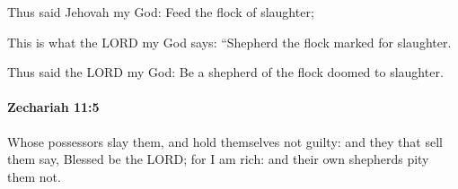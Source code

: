 			\begin{versebox}
					\item[BHS] 
					\item[LXX] 
					\item[ASV] Thus said Jehovah my God: Feed the flock of slaughter;
					\item[NIV] This is what the LORD my God says: “Shepherd the flock marked for slaughter.
					\item[NRSV] Thus said the LORD my God: Be a shepherd of the flock doomed to slaughter.
			\end{versebox}

		\paragraph{Zechariah 11:5} %
			\label{ZECHARIAH-11-5}

			Whose possessors slay them, and hold themselves not guilty: and they that sell them say, Blessed be the LORD; for I am rich: and their own shepherds pity them not.

